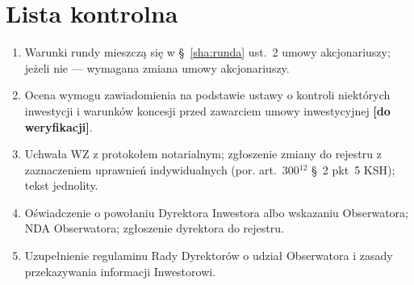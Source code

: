 \documentclass[11pt,a4paper]{report}
\newcommand{\field}[1]{\textbf{[#1]}}
\newcommand{\UA}[1]{§~#1 umowy akcjonariuszy}
\begin{document}
\section*{Lista kontrolna}

\begin{enumerate}
  \item Warunki rundy mieszczą się w \UA{\ref{sha:runda} ust.~2}; jeżeli nie --- wymagana zmiana umowy akcjonariuszy.
  \item Ocena wymogu zawiadomienia na podstawie ustawy o kontroli niektórych inwestycji i warunków koncesji przed zawarciem umowy inwestycyjnej \field{do weryfikacji}.
  \item Uchwała WZ z protokołem notarialnym; zgłoszenie zmiany do rejestru z zaznaczeniem uprawnień indywidualnych (por. art.~300$^{12}$ §~2 pkt~5 KSH); tekst jednolity.
  \item Oświadczenie o powołaniu Dyrektora Inwestora albo wskazaniu Obserwatora; NDA Obserwatora; zgłoszenie dyrektora do rejestru.
  \item Uzupełnienie regulaminu Rady Dyrektorów o udział Obserwatora i zasady przekazywania informacji Inwestorowi.
\end{enumerate}
\end{document}
